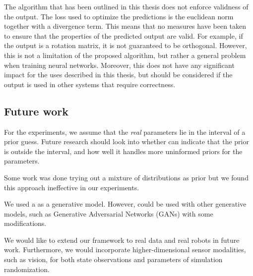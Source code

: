 The \dettostoc{} algorithm that has been outlined in this thesis does not enforce validness of the output. The loss used to optimize the predictions is the euclidean norm together with a divergence term. This means that no measures have been taken to ensure that the properties of the predicted output are valid. For example, if the output is a rotation matrix, it is not guaranteed to be orthogonal. However, this is not a limitation of the proposed \dettostoc{} algorithm, but rather a general problem when training neural networks. Moreover, this does not have any significant impact for the uses described in this thesis, but should be considered if the output is used in other systems that require correctness. %

\subsection{Future work}

For the experiments, we assume that the \textit{real} parameters lie in the interval of a prior guess. Future research should look into whether \dettostoc{} can indicate that the prior is outside the interval, and how well it handles more uninformed priors for the parameters.

Some work was done trying out a mixture of distributions as prior \parencite{DBLP:journals/corr/DilokthanakulMG16} but we found this approach ineffective in our experiments. 

We used a \cvae{} as a generative model. However, \dettostoc{} could be used with other generative models, such as Generative Adversarial Networks (GANs) \parencite{goodfellow2014} with some modifications.

We would like to extend our framework to real data and real robots in future work. Furthermore, we would incorporate higher-dimensional sensor modalities, such as vision, for both state observations and parameters of simulation randomization.

